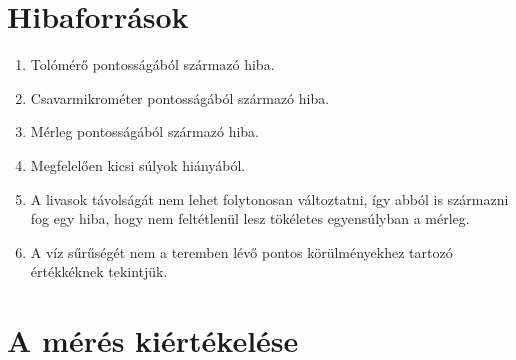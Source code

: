 \documentclass[10pt,pdftex]{report}
\begin{document}
\section*{Hibaforrások}
\begin{enumerate}
    \item{Tolómérő pontosságából származó hiba.}
    \item{Csavarmikrométer pontosságából származó hiba.}
    \item{Mérleg pontosságából származó hiba.}
    \item{Megfelelően kicsi súlyok hiányából.}
    \item{A livasok távolságát nem lehet folytonosan változtatni, így abból is származni fog egy hiba, hogy nem feltétlenül lesz tökéletes egyensúlyban a mérleg.}
    \item{A víz sűrűségét nem a teremben lévő pontos körülményekhez tartozó értékkéknek tekintjük.}
\end{enumerate}
\section*{A mérés kiértékelése}
\end{document}

